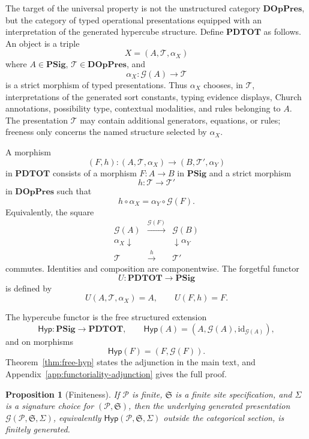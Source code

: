 \documentclass[11pt]{article}
\newcommand{\Sig}{\Sigma}
\newcommand{\Hyp}{\mathsf{Hyp}}
\newtheorem{proposition}[definition]{Proposition}
\begin{document}
The target of the universal property is not the unstructured category
\(\mathbf{DOpPres}\), but the category of typed operational presentations
equipped with an interpretation of the generated hypercube structure.  Define
\(\mathbf{PDTOT}\) as follows.  An object is a triple
\[
  X=(A,\mathcal{T},\alpha_X)
\]
where \(A\in\mathbf{PSig}\), \(\mathcal{T}\in\mathbf{DOpPres}\), and
\[
  \alpha_X:\mathcal{G}(A)\longrightarrow\mathcal{T}
\]
is a strict morphism of typed presentations.  Thus \(\alpha_X\) chooses, in
\(\mathcal{T}\), interpretations of the generated sort constants, typing
evidence displays, Church annotations, possibility type, contextual modalities,
and rules belonging to \(A\).  The presentation \(\mathcal{T}\) may contain
additional generators, equations, or rules; freeness only concerns the named
structure selected by \(\alpha_X\).

A morphism
\[
  (F,h):(A,\mathcal{T},\alpha_X)
  \longrightarrow
  (B,\mathcal{T}',\alpha_Y)
\]
in \(\mathbf{PDTOT}\) consists of a morphism \(F:A\to B\) in
\(\mathbf{PSig}\) and a strict morphism
\[
  h:\mathcal{T}\to\mathcal{T}'
\]
in \(\mathbf{DOpPres}\) such that
\[
  h\circ\alpha_X
  =
  \alpha_Y\circ\mathcal{G}(F).
\]
Equivalently, the square
\[
\begin{array}{ccc}
  \mathcal{G}(A) & \xrightarrow{\mathcal{G}(F)} & \mathcal{G}(B) \\
  {\scriptstyle \alpha_X}\downarrow & & \downarrow{\scriptstyle \alpha_Y} \\
  \mathcal{T} & \xrightarrow{h} & \mathcal{T}'
\end{array}
\]
commutes.  Identities and composition are componentwise.  The forgetful
functor
\[
  U:\mathbf{PDTOT}\longrightarrow\mathbf{PSig}
\]
is defined by
\[
  U(A,\mathcal{T},\alpha_X)=A,
  \qquad
  U(F,h)=F.
\]

The hypercube functor is the free structured extension
\[
  \Hyp:\mathbf{PSig}\longrightarrow\mathbf{PDTOT},
  \qquad
  \Hyp(A)=(A,\mathcal{G}(A),\mathrm{id}_{\mathcal{G}(A)}),
\]
and on morphisms
\[
  \Hyp(F)=(F,\mathcal{G}(F)).
\]
Theorem~\ref{thm:free-hyp} states the adjunction in the main text, and Appendix~\ref{app:functoriality-adjunction} gives the full proof.

\begin{proposition}[Finiteness]
If \(\mathcal{P}\) is finite, \(\mathfrak{S}\) is a finite site specification, and \(\Sig\) is a signature choice for \((\mathcal{P},\mathfrak{S})\), then the underlying generated presentation \(\mathcal{G}(\mathcal{P},\mathfrak{S},\Sig)\), equivalently \(\Hyp(\mathcal{P},\mathfrak{S},\Sig)\) outside the categorical section, is finitely generated.
\end{proposition}
\end{document}
